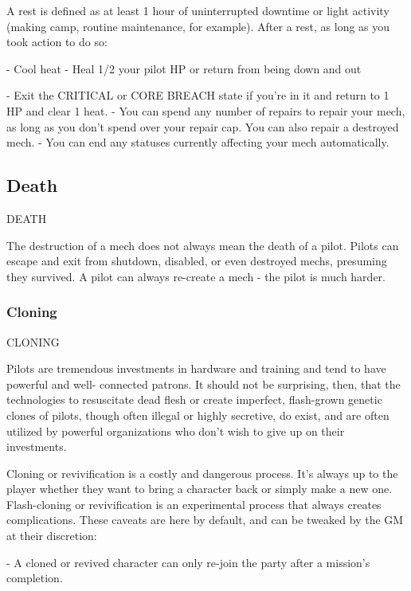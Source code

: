 A rest is defined as at least 1 hour of uninterrupted downtime or light activity (making camp,  
routine maintenance, for example). After a rest, as long as you took action to do so:
 
             -   Cool heat  
             -    Heal 1/2 your pilot HP or return from being down and out
 
             -    Exit the CRITICAL or CORE BREACH state if you’re in it and return to 1 HP and  
                 clear 1 heat.  
             -   You can spend any number of repairs to repair your mech, as long as you don’t  
                 spend over your repair cap. You can also repair a destroyed mech.  
             -   You can end any statuses currently affecting your mech automatically.  

                                                                                                                 
\subsection{Death}
  DEATH  

The destruction of a mech does not always mean the death of a pilot. Pilots can escape and exit  
from shutdown, disabled, or even destroyed mechs, presuming they survived. A pilot can always  
re-create a mech - the pilot is much harder.
 
\subsubsection{Cloning}
                                                  CLONING  

Pilots are tremendous investments in hardware and training and tend to have powerful and well- 
connected patrons. It should not be surprising, then, that the technologies to resuscitate dead  
flesh or create imperfect, flash-grown genetic clones of pilots, though often illegal or highly  
secretive, do exist, and are often utilized by powerful organizations who don’t wish to give up on  
their investments.
 

Cloning or revivification is a costly and dangerous process. It’s always up to the player whether  
they want to bring a character back or simply make a new one. Flash-cloning or revivification  
is an experimental process that always creates complications. These caveats are here by  
default, and can be tweaked by the GM at their discretion:
 

    -    A cloned or revived character can only re-join the party after a mission’s completion.
 
